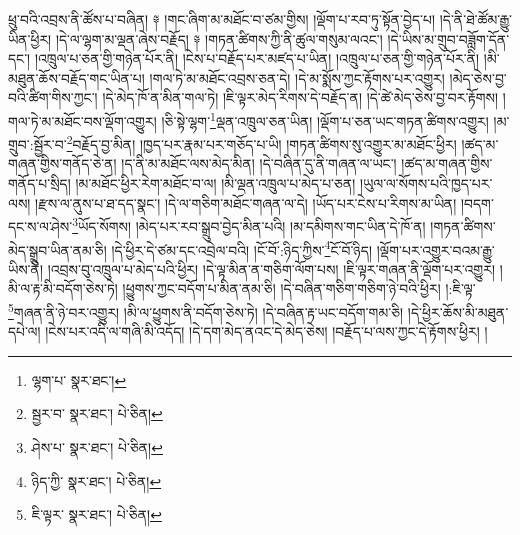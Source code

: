 ཕྲུ་བའི་འབྲས་ནི་ཚོས་པ་བཞིན། ༈ །གང་ཞིག་མ་མཐོང་བ་ཙམ་གྱིས། །ལྡོག་པ་རབ་ཏུ་སྟོན་བྱེད་པ། །དེ་ནི་ཐེ་ཚོམ་རྒྱུ་ཡིན་ཕྱིར། །དེ་ལ་ལྷག་མ་ལྡན་ཞེས་བརྗོད། ༈ །གཏན་ཚིགས་ཀྱི་ནི་ཚུལ་གསུམ་ལའང་། །དེ་ཡིས་མ་གྲུབ་བཟློག་དོན་དང་། །འཁྲུལ་པ་ཅན་གྱི་གཉེན་པོར་ནི། །ངེས་པ་བརྗོད་པར་མཛད་པ་ཡིན། །འཁྲུལ་པ་ཅན་གྱི་གཉེན་པོར་ནི། །མི་མཐུན་ཆོས་བརྗོད་གང་ཡིན་པ། །གལ་ཏེ་མ་མཐོང་འབྲས་ཅན་དེ། །དེ་མ་སྨོས་ཀྱང་རྟོགས་པར་འགྱུར། །མེད་ཅེས་བྱ་བའི་ཚིག་གིས་ཀྱང་། །དེ་མེད་ཁོ་ན་མིན་གལ་ཏེ། །ཇི་ལྟར་མེད་རིགས་དེ་བརྗོད་ན། །དེ་ཚེ་མེད་ཅེས་བྱ་བར་རྟོགས། །གལ་ཏེ་མ་མཐོང་བས་ལྡོག་འགྱུར། །ཅི་སྟེ་ལྷག་\footnote{ལྷག་པ་  སྣར་ཐང་། }ལྡན་འཁྲུལ་ཅན་ཡིན། །ལྡོག་པ་ཅན་ཡང་གཏན་ཚིགས་འགྱུར། །མ་གྲུབ་:སྦྱོར་བ་\footnote{སྦྱར་བ་  སྣར་ཐང་།  པེ་ཅིན། }བརྗོད་བྱ་མིན། །ཁྱད་པར་རྣམ་པར་གཅོད་པ་ཡི། །གཏན་ཚིགས་སུ་འགྱུར་མ་མཐོང་ཕྱིར། །ཚད་མ་གཞན་གྱིས་གནོད་ཅེ་ན། །ད་ནི་མ་མཐོང་ལས་མེད་མིན། །དེ་བཞིན་དུ་ནི་གཞན་ལ་ཡང་། །ཚད་མ་གཞན་གྱིས་གནོད་པ་སྲིད། །མ་མཐོང་ཕྱིར་རེག་མཐོང་བ་ལ། །མི་ལྡན་འཁྲུལ་པ་མེད་པ་ཅན། །ཡུལ་ལ་སོགས་པའི་ཁྱད་པར་ལས། །རྫས་ལ་ནུས་པ་ཐ་དད་སྣང་། །དེ་ལ་གཅིག་མཐོང་གཞན་ལ་དེ། །ཡོད་པར་ངེས་པ་རིགས་མ་ཡིན། །བདག་དང་ས་ལ་ཤེས་\footnote{ཤེས་པ་  སྣར་ཐང་།  པེ་ཅིན། }ཡོད་སོགས། །མེད་པར་རབ་སྒྲུབ་བྱེད་མིན་པའི། །མ་དམིགས་གང་ཡིན་དེ་ཁོ་ན། །གཏན་ཚིགས་མེད་སྒྲུབ་ཡིན་ནམ་ཅི། །དེ་ཕྱིར་དེ་ཙམ་དང་འབྲེལ་བའི། །ངོ་བོ་:ཉིད་ཀྱིས་\footnote{ཉིད་ཀྱི་  སྣར་ཐང་།  པེ་ཅིན། }ངོ་བོ་ཉིད། །ལྡོག་པར་འགྱུར་བའམ་རྒྱུ་ཡིས་ནི། །འབྲས་བུ་འཁྲུལ་པ་མེད་པའི་ཕྱིར། །དེ་ལྟ་མིན་ན་གཅིག་ལོག་པས། །ཇི་ལྟར་གཞན་ནི་ལྡོག་པར་འགྱུར། །མི་ལ་རྟ་མི་བདོག་ཅེས་ཏེ། །ཕྱུགས་ཀྱང་བདོག་པ་མིན་ནམ་ཅི། །དེ་བཞིན་གཅིག་གཅིག་ཉེ་བའི་ཕྱིར། །:ཇི་ལྟ་\footnote{ཇི་ལྟར་  སྣར་ཐང་།  པེ་ཅིན། }གཞན་ནི་ཉེ་བར་འགྱུར། །མི་ལ་ཕྱུགས་ནི་བདོག་ཅེས་ཏེ། །དེ་བཞིན་རྟ་ཡང་བདོག་གམ་ཅི། །དེ་ཕྱིར་ཆོས་མི་མཐུན་དཔེ་ལ། །ངེས་པར་འདི་ལ་གཞི་མི་འདོད། །དེ་དག་མེད་ནའང་དེ་མེད་ཅེས། །བརྗོད་པ་ལས་ཀྱང་དེ་རྟོགས་ཕྱིར། །
